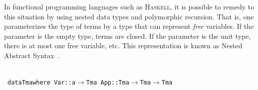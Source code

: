 \documentclass[9pt,authoryear]{sigplanconf}
\begin{document}
%
In functional programming languages such as \textsc{Haskell}, it is
    possible to remedy to this situation by using nested data types
    and polymorphic recursion. That is, one parameterizes the type of
    terms by a type that can represent \emph{free} variables. If the
    parameter is the empty type, terms are closed. If the parameter is
    the unit type, there is at most one free variable, etc.
    This representation is known as Nested Abstract Syntax{~}\cite{bellegarde-94,bird-paterson-99,altenkirch-reus-99}.%


{\nopagebreak }

%
%
%
~\\~\vphantom{$\{$}\texttt{data}\texttt{\mbox{\hspace{0.50em}}}\texttt{Tm}\texttt{\mbox{\hspace{0.50em}}}\texttt{a}\texttt{\mbox{\hspace{0.50em}}}\texttt{where}\texttt{{\nopagebreak \newline%
}\vphantom{$\{$}}\texttt{\mbox{\hspace{0.50em}}}\texttt{\mbox{\hspace{0.50em}}}\texttt{Var}\texttt{\mbox{\hspace{0.50em}}}\texttt{{:}{:}}\texttt{\mbox{\hspace{0.50em}}}\texttt{a}\texttt{\mbox{\hspace{0.50em}}}\texttt{$ \rightarrow $}\texttt{\mbox{\hspace{0.50em}}}\texttt{Tm}\texttt{\mbox{\hspace{0.50em}}}\texttt{a}\texttt{{\nopagebreak \newline%
}\vphantom{$\{$}}\texttt{\mbox{\hspace{0.50em}}}\texttt{\mbox{\hspace{0.50em}}}\texttt{App}\texttt{\mbox{\hspace{0.50em}}}\texttt{{:}{:}}\texttt{\mbox{\hspace{0.50em}}}\texttt{Tm}\texttt{\mbox{\hspace{0.50em}}}\texttt{a}\texttt{\mbox{\hspace{0.50em}}}\texttt{$ \rightarrow $}\texttt{\mbox{\hspace{0.50em}}}\texttt{Tm}\texttt{\mbox{\hspace{0.50em}}}\texttt{a}\texttt{\mbox{\hspace{0.50em}}}\texttt{$ \rightarrow $}\texttt{\mbox{\hspace{0.50em}}}\texttt{Tm}\texttt{\mbox{\hspace{0.50em}}}\texttt{a}\texttt{{\nopagebreak \newline%
}}
\end{document}

